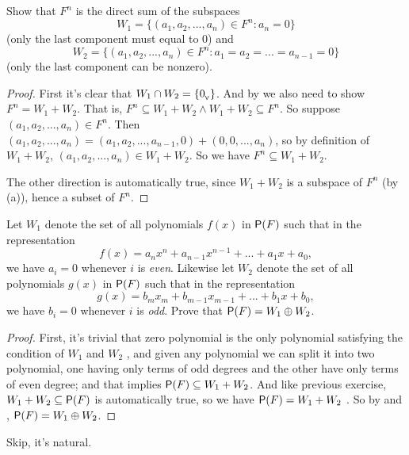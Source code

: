 \begin{exercise} \label{exercise 1.3.24}
Show that \(F^n\) is the direct sum of the subspaces
\[
    W_1 = \{(a_1, a_2, ..., a_n) \in F^n : a_n = 0 \}
\]
(only the last component must equal to \(0\)) and
\[
    W_2 = \{(a_1, a_2, ..., a_n) \in F^n : a_1 = a_2 = ... = a_{n - 1} = 0 \}
\]
(only the last component can be nonzero).
\end{exercise}

\begin{proof}
First it's clear that \(W_1 \cap W_2 = \{ 0_{_{\textsf{V}}} \}\).
And by  we also need to show \(F^n = W_1 + W_2\).
That is, \(F^n \subseteq W_1 + W_2 \land W_1 + W_2 \subseteq F^n\).
So suppose \((a_1, a_2, ..., a_n) \in F^n\).
Then \((a_1, a_2, ..., a_n) = (a_1, a_2, ..., a_{n - 1}, 0) + (0, 0, ..., a_n)\), so by definition of \(W_1 + W_2\), \((a_1, a_2, ..., a_n) \in W_1 + W_2\).
So we have \(F^n \subseteq W_1 + W_2\).

The other direction is automatically true, since \(W_1 + W_2\) is a subspace of \(F^n\) (by (a)), hence a subset of \(F^n\).
\end{proof}

\begin{exercise} \label{exercise 1.3.25}
Let \(W_1\) denote the set of all polynomials \(f(x)\) in \(\textsf{P}(F)\) such that in the representation
\[
    f(x) = a_n x^n + a_{n - 1} x^{n - 1} + ... + a_1 x + a_0,
\]
we have \(a_i = 0\) whenever \(i\) is \emph{even}.
Likewise let \(W_2\) denote the set of all polynomials \(g(x)\) in \(\textsf{P}(F)\) such that in the representation
\[
    g(x) = b_m x_m + b_{m - 1} x_{m - 1} + ... + b_1 x + b_0,
\]
we have \(b_i = 0\) whenever \(i\) is \emph{odd}.
Prove that \(\textsf{P}(F) = W_1 \oplus W_2\).
\end{exercise}

\begin{proof}
First, it's trivial that zero polynomial is the only polynomial satisfying the condition of \(W_1\) and \(W_2\) ,
and given any polynomial we can split it into two polynomial, one having only terms of odd degrees and the other have only terms of even degree;
and that implies \(\textsf{P}(F) \subseteq W_1 + W_2\).
And like previous exercise, \(W_1 + W_2 \subseteq \textsf{P}(F)\) is automatically true, so we have \(\textsf{P}(F) = W_1 + W_2\) .
So by  and , \(\textsf{P}(F) = W_1 \oplus W_2\).
\end{proof}

\begin{exercise} \label{exercise 1.3.26}
Skip, it's natural.
\end{exercise}

